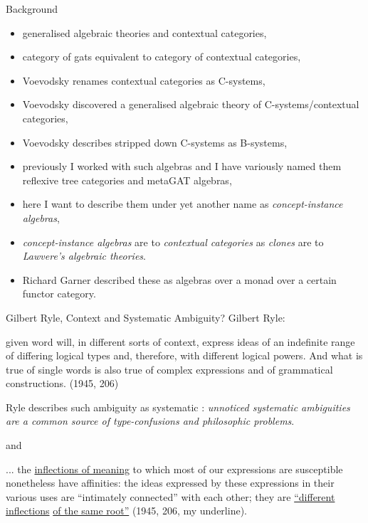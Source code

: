 \begin{frame}{Background}
\begin{itemize}
\item generalised algebraic theories and contextual categories,
\item category of gats equivalent to category of contextual categories,
\item Voevodsky renames contextual categories as C-systems,
\item Voevodsky discovered a generalised algebraic theory of C-systems/contextual categories,
\item Voevodsky describes stripped down  C-systems as B-systems,
\item previously I worked with such algebras and I have variously named them reflexive tree categories and metaGAT algebras,
\item here I want to describe them under yet another name as \textit{concept-instance algebras},
\item \textit{concept-instance algebras} are to \textit{contextual categories} as \textit{clones} are to \textit{Lawvere's  algebraic theories}.
\item Richard Garner described these as algebras over a monad over a certain functor category.
\end{itemize}
\end{frame}

\begin{frame}{Gilbert Ryle, Context and Systematic Ambiguity?}
Gilbert Ryle:
\begin{tightquote}
[a] given word will, in different sorts of context, express ideas of an indefinite range of differing logical types and, therefore, with different logical powers. And what is true of single words is also true of complex expressions and of grammatical constructions. (1945, 206)
\end{tightquote}
\medskip
Ryle describes such ambiguity as systematic : \textit{unnoticed systematic ambiguities are a common source of type-confusions and philosophic problems}.
\end{frame}
\begin{frame}
and
\begin{tightquote}
... the \underline{inflections of meaning} to which most of our expressions are susceptible nonetheless have affinities: the ideas expressed by these expressions in their various uses are “intimately connected” with each other; 
they are \underline{“different inflections} \underline{of the same root”} (1945, 206, my underline).
\end{tightquote}
\end{frame}


